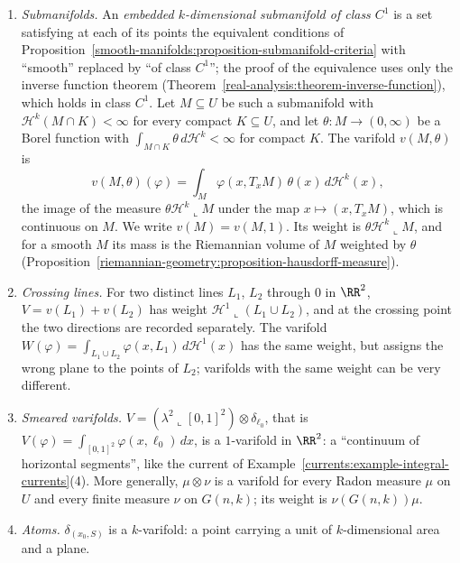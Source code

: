 \begin{example}\label{varifolds:example-varifolds}
\begin{enumerate}
\item \emph{Submanifolds.} An \emph{embedded $k$-dimensional submanifold of class $C^1$} is a set satisfying at each of its points the equivalent conditions of
Proposition~\ref{smooth-manifolds:proposition-submanifold-criteria} with ``smooth'' replaced by ``of class $C^1$''; the proof of the equivalence uses only the inverse function theorem
(Theorem~\ref{real-analysis:theorem-inverse-function}), which holds in class $C^1$. Let $M \subseteq U$ be such a submanifold with $\mathcal{H}^k(M \cap K) < \infty$ for every compact $K \subseteq U$, and let
$\theta \colon M \to (0, \infty)$ be a Borel function with $\int_{M \cap K}\theta\,d\mathcal{H}^k < \infty$ for compact $K$. The varifold $v(M, \theta)$ is
\[
v(M, \theta)(\varphi) = \int_M\varphi(x, T_xM)\,\theta(x)\,d\mathcal{H}^k(x),
\]
the image of the measure $\theta\mathcal{H}^k\llcorner M$ under the map $x \mapsto (x, T_xM)$, which is continuous on $M$. We write $v(M) = v(M, 1)$. Its weight is $\theta\mathcal{H}^k\llcorner M$, and for a
smooth $M$ its mass is the Riemannian volume of $M$ weighted by $\theta$ (Proposition~\ref{riemannian-geometry:proposition-hausdorff-measure}).
\item \emph{Crossing lines.} For two distinct lines $L_1$, $L_2$ through $0$ in $\RR^2$, $V = v(L_1) + v(L_2)$ has weight $\mathcal{H}^1\llcorner(L_1 \cup L_2)$, and at the crossing point the two
directions are recorded separately. The varifold $W(\varphi) = \int_{L_1 \cup L_2}\varphi(x, L_1)\,d\mathcal{H}^1(x)$ has the same weight, but assigns the wrong plane to the points of $L_2$; varifolds with the
same weight can be very different.
\item \emph{Smeared varifolds.} $V = (\lambda^2\llcorner[0, 1]^2) \otimes \delta_{\ell_0}$, that is $V(\varphi) = \int_{[0, 1]^2}\varphi(x, \ell_0)\,dx$, is a $1$-varifold in $\RR^2$: a ``continuum of
horizontal segments'', like the current of Example~\ref{currents:example-integral-currents}(4). More generally, $\mu \otimes \nu$ is a varifold for every Radon measure $\mu$ on $U$ and every finite measure $\nu$
on $G(n, k)$; its weight is $\nu(G(n, k))\mu$.
\item \emph{Atoms.} $\delta_{(x_0, S)}$ is a $k$-varifold: a point carrying a unit of $k$-dimensional area and a plane.
\end{enumerate}
\end{example}

